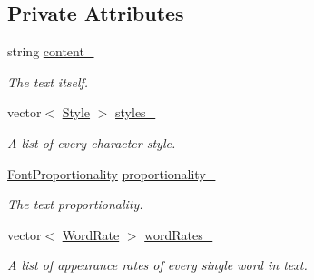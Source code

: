 \subsection*{Private Attributes}
\begin{CompactItemize}
\item 
\hypertarget{class_text_6db21a43e3b2d0795efad5be93bbea90}{
string \hyperlink{class_text_6db21a43e3b2d0795efad5be93bbea90}{content\_\-}}
\label{class_text_6db21a43e3b2d0795efad5be93bbea90}

\begin{CompactList}\small\item\em The text itself. \item\end{CompactList}\item 
\hypertarget{class_text_bc777b68be5bbf0799283e10fbb235a1}{
vector$<$ \hyperlink{class_style}{Style} $>$ \hyperlink{class_text_bc777b68be5bbf0799283e10fbb235a1}{styles\_\-}}
\label{class_text_bc777b68be5bbf0799283e10fbb235a1}

\begin{CompactList}\small\item\em A list of every character style. \item\end{CompactList}\item 
\hypertarget{class_text_6049856ff19b54d4d23d6cfd7e629c7a}{
\hyperlink{_font_proportionality_8h_a9aa255df24db58a9b4cbc46941f2ac1}{FontProportionality} \hyperlink{class_text_6049856ff19b54d4d23d6cfd7e629c7a}{proportionality\_\-}}
\label{class_text_6049856ff19b54d4d23d6cfd7e629c7a}

\begin{CompactList}\small\item\em The text proportionality. \item\end{CompactList}\item 
\hypertarget{class_text_7517ff1f470d275d3013857f98ceb6ef}{
vector$<$ \hyperlink{_word_rate_8h_e8f43926daba5798edbb3cb94ad07ff7}{WordRate} $>$ \hyperlink{class_text_7517ff1f470d275d3013857f98ceb6ef}{wordRates\_\-}}
\label{class_text_7517ff1f470d275d3013857f98ceb6ef}

\begin{CompactList}\small\item\em A list of appearance rates of every single word in text. \item\end{CompactList}\end{CompactItemize}


